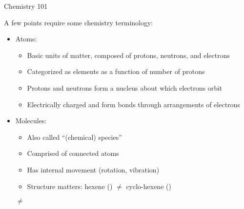 \begin{frame}{Chemistry 101}

A few points require some chemistry terminology:

\vspace{0.5cm}

 \begin{itemize}
  
  \item Atoms:
  \begin{itemize}
  	\item Basic units of matter, composed of protons, neutrons, and electrons
  	\item Categorized as elements as a function of number of protons
  	\item Protons and neutrons form a nucleus about which electrons orbit
  	\item Electrically charged and form bonds through arrangements of electrons
  \end{itemize}
  
  \item Molecules:
  \begin{itemize}
    \item Also called ``(chemical) species''
  	\item Comprised of connected atoms
	\item Has internal movement (rotation, vibration)
	\item Structure matters: hexene () $\neq$ cyclo-hexene ()
  \end{itemize}
  
  \vspace{10pt}
  
	\hspace{29mm} \hspace{3mm}$\neq$\hspace{3mm} 
  

 \end{itemize}
 
\end{frame}


